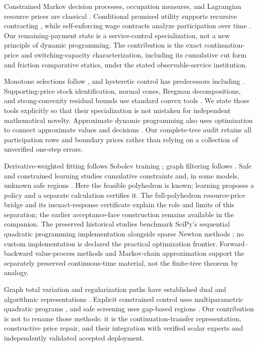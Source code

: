 \documentclass[11pt,letterpaper]{article}
\theoremstyle{definition}
\newcommand{\1}{\mathbf 1}
\begin{document}
Constrained Markov decision processes, occupation measures, and Lagrangian resource prices are classical \citep{Altman1999}. Conditional promised utility supports recursive contracting \citep{SpearSrivastava1987}, while self-enforcing wage contracts analyze participation over time \citep{ThomasWorrall1988}. Our remaining-payment state is a service-control specialization, not a new principle of dynamic programming. The contribution is the exact continuation-price and switching-capacity characterization, including its cumulative cut form and friction comparative statics, under the stated observable-service institution.

Monotone selections follow \citet{Topkis1978}, and hysteretic control has predecessors including \citet{HippHolzbaur1988}. Supporting-price stock identification, normal cones, Bregman decompositions, and strong-convexity residual bounds use standard convex tools \citep{BoydVandenberghe2004}. We state those tools explicitly so that their specialization is not mistaken for independent mathematical novelty. Approximate dynamic programming also uses optimization to connect approximate values and decisions \citep{DeFariasVanRoy2003}. Our complete-tree audit retains all participation rows and boundary prices rather than relying on a collection of unverified one-step errors.

Derivative-weighted fitting follows Sobolev training \citep{Czarnecki2017}; graph filtering follows \citet{Defferrard2016}. Safe and constrained learning studies cumulative constraints and, in some models, unknown safe regions \citep{Satija2020,WachiSui2020}. Here the feasible polyhedron is known; learning proposes a policy and a separate calculation certifies it. The full-polyhedron resource-price bridge and its inexact-response certificate explain the role and limits of this separation; the earlier acceptance-face construction remains available in the companion. The preserved historical studies benchmark SciPy's sequential quadratic programming implementation alongside sparse Newton methods \citep{Virtanen2020}; no custom implementation is declared the practical optimization frontier. Forward--backward value-process methods \citep{MaProtterYong1994,HanJentzenE2018} and Markov-chain approximation \citep{KushnerDupuis2001} support the separately preserved continuous-time material, not the finite-tree theorem by analogy.

Graph total variation and regularization paths have established dual and algorithmic representations \citep{TibshiraniTaylor2011,ArnoldTibshirani2016}. Explicit constrained control uses multiparametric quadratic programs \citep{Bemporad2002}, and safe screening uses gap-based regions \citep{Fercoq2015}. Our contribution is not to rename those methods: it is the continuation-transfer representation, constructive price repair, and their integration with verified scalar experts and independently validated accepted deployment.
\end{document}
